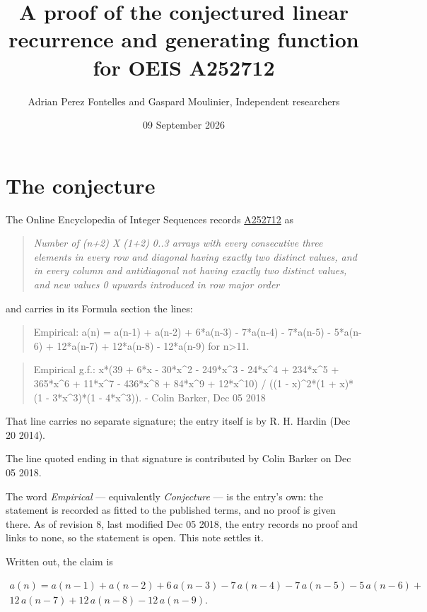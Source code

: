 \documentclass[11pt]{article}
\title{A proof of the conjectured linear recurrence and generating function for OEIS A252712}
\author{Adrian Perez Fontelles and Gaspard Moulinier, Independent researchers}
\date{09 September 2026}
\theoremstyle{definition}
\begin{document}
\maketitle
\section{The conjecture}

The Online Encyclopedia of Integer Sequences records \href{https://oeis.org/A252712}{A252712} as

\begin{quote}\itshape Number of (n+2) X (1+2) 0..3 arrays with every consecutive three elements in every row and diagonal having exactly two distinct values, and in every column and antidiagonal not having exactly two distinct values, and new values 0 upwards introduced in row major order\end{quote}

and carries in its Formula section the lines:

\begin{quote}\ttfamily Empirical: a(n) = a(n-1) + a(n-2) + 6*a(n-3) - 7*a(n-4) - 7*a(n-5) - 5*a(n-6) + 12*a(n-7) + 12*a(n-8) - 12*a(n-9) for n>11.\end{quote}

\begin{quote}\ttfamily Empirical g.f.: x*(39 + 6*x - 30*x\textasciicircum{}2 - 249*x\textasciicircum{}3 - 24*x\textasciicircum{}4 + 234*x\textasciicircum{}5 + 365*x\textasciicircum{}6 + 11*x\textasciicircum{}7 - 436*x\textasciicircum{}8 + 84*x\textasciicircum{}9 + 12*x\textasciicircum{}10) / ((1 - x)\textasciicircum{}2*(1 + x)*(1 - 3*x\textasciicircum{}3)*(1 - 4*x\textasciicircum{}3)). - Colin Barker, Dec 05 2018\end{quote}

That line carries no separate signature; the entry itself is by R. H. Hardin (Dec 20 2014).

The line quoted ending in that signature is contributed by Colin Barker on Dec 05 2018.

The word {\itshape Empirical} --- equivalently {\itshape Conjecture} --- is the entry's own: the statement is recorded as fitted to the published terms, and no proof is given there. As of revision 8, last modified Dec 05 2018, the entry records no proof and links to none, so the statement is open. This note settles it.

Written out, the claim is

\begin{multline*} a(n) = a(n-1) + a(n-2) + 6\,a(n-3) - 7\,a(n-4) - 7\,a(n-5) - 5\,a(n-6) + \\ 12\,a(n-7) + 12\,a(n-8) - 12\,a(n-9). \end{multline*}
\end{document}
